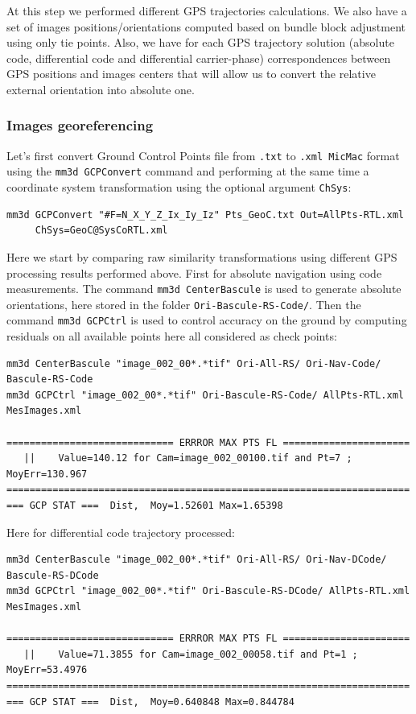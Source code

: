 At this step we performed different GPS trajectories calculations. We also have a set of images positions/orientations computed based on bundle block adjustment using only tie points. Also, we have for each GPS trajectory solution (absolute code, differential code and differential carrier-phase) correspondences between GPS positions and images centers that will allow us to convert the relative external orientation into absolute one.

\subsubsection{Images georeferencing}\label{sec_basc}
Let's first convert Ground Control Points file from {\tt .txt} to {\tt .xml MicMac} format using the {\tt mm3d GCPConvert} command and performing at the same time a coordinate system transformation using the optional argument {\tt ChSys}:

\begin{verbatim}
mm3d GCPConvert "#F=N_X_Y_Z_Ix_Iy_Iz" Pts_GeoC.txt Out=AllPts-RTL.xml 
     ChSys=GeoC@SysCoRTL.xml
\end{verbatim}

Here we start by comparing raw similarity transformations using different GPS processing results performed above. First for absolute navigation using code measurements. The command {\tt mm3d CenterBascule} is used to generate absolute orientations, here stored in the folder {\tt Ori-Bascule-RS-Code/}. Then the command {\tt mm3d GCPCtrl} is used to control accuracy on the ground by computing residuals on all available points here all considered as check points:

\begin{verbatim}
mm3d CenterBascule "image_002_00*.*tif" Ori-All-RS/ Ori-Nav-Code/ Bascule-RS-Code
mm3d GCPCtrl "image_002_00*.*tif" Ori-Bascule-RS-Code/ AllPts-RTL.xml MesImages.xml

============================= ERRROR MAX PTS FL ======================
   ||    Value=140.12 for Cam=image_002_00100.tif and Pt=7 ; MoyErr=130.967
======================================================================
=== GCP STAT ===  Dist,  Moy=1.52601 Max=1.65398
\end{verbatim}


Here for differential code trajectory processed:

\begin{verbatim}
mm3d CenterBascule "image_002_00*.*tif" Ori-All-RS/ Ori-Nav-DCode/ Bascule-RS-DCode
mm3d GCPCtrl "image_002_00*.*tif" Ori-Bascule-RS-DCode/ AllPts-RTL.xml MesImages.xml

============================= ERRROR MAX PTS FL ======================
   ||    Value=71.3855 for Cam=image_002_00058.tif and Pt=1 ; MoyErr=53.4976
======================================================================
=== GCP STAT ===  Dist,  Moy=0.640848 Max=0.844784
\end{verbatim}


